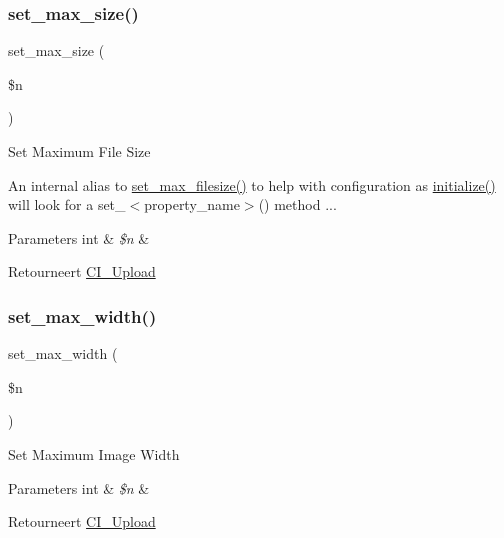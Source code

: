 \subsubsection{\texorpdfstring{set\_max\_size()}{set\_max\_size()}}
{\footnotesize\ttfamily set\+\_\+max\+\_\+size (\begin{DoxyParamCaption}\item[{}]{\$n }\end{DoxyParamCaption})\hspace{0.3cm}{\ttfamily [protected]}}

Set Maximum File Size

An internal alias to \mbox{\hyperlink{class_c_i___upload_a1f78c3a54f32d313294b27cde4eafaf4}{set\+\_\+max\+\_\+filesize()}} to help with configuration as \mbox{\hyperlink{class_c_i___upload_a58cef448bae0c178f3f675700b7e4413}{initialize()}} will look for a set\+\_\+$<$property\+\_\+name$>$() method ...


\begin{DoxyParams}[1]{Parameters}
int & {\em \$n} & \\
\hline
\end{DoxyParams}
\begin{DoxyReturn}{Retourneert}
\mbox{\hyperlink{class_c_i___upload}{C\+I\+\_\+\+Upload}} 
\end{DoxyReturn}
\mbox{\label{class_c_i___upload_a4028f187a825a666976cc3fe47cd44a8}} 
\subsubsection{\texorpdfstring{set\_max\_width()}{set\_max\_width()}}
{\footnotesize\ttfamily set\+\_\+max\+\_\+width (\begin{DoxyParamCaption}\item[{}]{\$n }\end{DoxyParamCaption})}

Set Maximum Image Width


\begin{DoxyParams}[1]{Parameters}
int & {\em \$n} & \\
\hline
\end{DoxyParams}
\begin{DoxyReturn}{Retourneert}
\mbox{\hyperlink{class_c_i___upload}{C\+I\+\_\+\+Upload}} 
\end{DoxyReturn}
\mbox{\label{class_c_i___upload_a72c6007605b27c92dfd83c6e21fe82e3}} 
